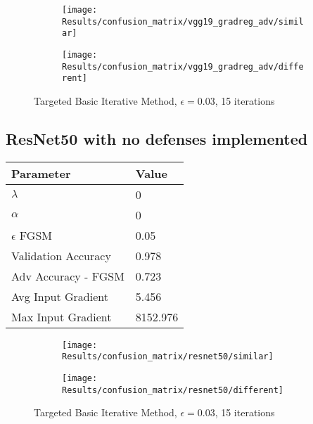 \documentclass[draft,final]{vutinfth} %
\begin{document}
\begin{figure}[h]
  \begin{subfigure}[b]{0.75\columnwidth}
		\centering
    \texttt{[image: Results/confusion\_matrix/vgg19\_gradreg\_adv/similar]}
    \label{fig:exp:cm:vgg19_gradreg_adv:similar}
  \end{subfigure}
  \begin{subfigure}[b]{0.75\columnwidth}
		\centering
    \texttt{[image: Results/confusion\_matrix/vgg19\_gradreg\_adv/different]}
    \label{fig:exp:cm:vgg19_gradreg_adv:different}
  \end{subfigure}
  \caption{Targeted Basic Iterative Method, $\epsilon = 0.03$, 15 iterations}
  \label{fig:exp:cm:vgg19_gradreg_adv}
\end{figure}

\subsection{ResNet50 with no defenses implemented}

\begin{table}[h]
  \centering
  \begin{tabular}{ll}
    \toprule
			Parameter			& Value   \\
    \midrule
			$\lambda$								& 0				\\
			$\alpha$								& 0				\\
			$\epsilon$ FGSM					& 0.05		\\
			
			Validation Accuracy			& 0.978		\\ 
			Adv Accuracy - FGSM			& 0.723		\\
			
			Avg Input Gradient			& 5.456		\\
			Max Input Gradient			& 8152.976\\
    \bottomrule
  \end{tabular}
\end{table}


\begin{figure}[h]
  \begin{subfigure}[b]{0.75\columnwidth}
		\centering
    \texttt{[image: Results/confusion\_matrix/resnet50/similar]}
    \label{fig:exp:cm:resnet50:similar}
  \end{subfigure}
  \begin{subfigure}[b]{0.75\columnwidth}
		\centering
    \texttt{[image: Results/confusion\_matrix/resnet50/different]}
    \label{fig:exp:cm:resnet50:different}
  \end{subfigure}
  \caption{Targeted Basic Iterative Method, $\epsilon = 0.03$, 15 iterations}
  \label{fig:exp:cm:resnet50}
\end{figure}
\end{document}
